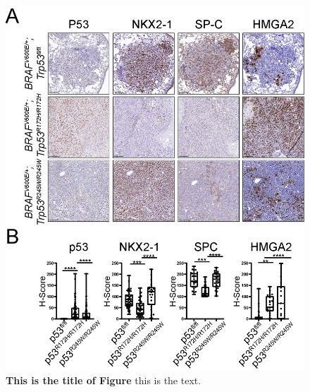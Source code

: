 \begin{figure}
\hypertarget{fig:04}{%
\centering
\includegraphics[width=1\textwidth,height=\textheight]{images/p53_4.png}
\caption{\textbf{This is the title of Figure} this is the text.}\label{fig:04}
}
\end{figure}

